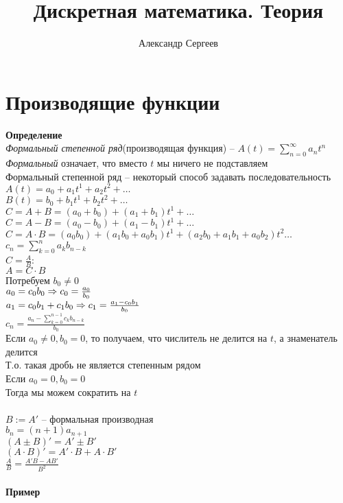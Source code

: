 \documentclass[12pt]{article}
\title{Дискретная математика. Теория}
\author{Александр Сергеев}
\date{}
\begin{document}
\maketitle
\section{Производящие функции}
\textbf{Определение}\\
\textit{Формальный степенной ряд}(производящая функция) -- $A(t) = \sum_{n=0}^\infty a_nt^n$\\
\textit{Формальный} означает, что вместо $t$ мы ничего не подставляем\\
Формальный степенной ряд -- некоторый способ задавать последовательность\\
$A(t) = a_0 + a_1t^1 + a_2t^2 + \ldots$\\
$B(t) = b_0 + b_1t^1 + b_2t^2 + \ldots$\\
$C=A + B = (a_0+b_0) + (a_1+b_1)t^1 + \ldots$\\
$C=A - B = (a_0-b_0) + (a_1-b_1)t^1 + \ldots$\\
$C=A \cdot B = (a_0b_0) + (a_1b_0 + a_0b_1)t^1 + (a_2b_0 + a_1b_1 + a_0b_2)t^2\ldots$\\
$c_n = \sum_{k=0}^na_kb_{n-k}$\\
$C=\frac{A}{B}$:\\
$A=C\cdot B$\\
Потребуем $b_0 \neq 0$\\
$a_0 = c_0b_0 \Rightarrow c_0 = \frac{a_0}{b_0}$\\
$a_1 = c_0b_1 + c_1b_0 \Rightarrow c_1 = \frac{a_1-c_0b_1}{b_0}$\\
$c_n = \frac{a_n - \sum_{k=0}^{n-1}c_kb_{n-k}}{b_0}$\\
Если $a_0 \neq 0, b_0 = 0$, то получаем, что числитель не делится на $t$, а знаменатель делится\\
Т.о. такая дробь не является степенным рядом\\
Если $a_0=0, b_0 = 0$\\
Тогда мы можем сократить на $t$\\\\
$B:=A'$ -- формальная производная\\
$b_n=(n+1)a_{n+1}$\\
$(A\pm B)' = A'\pm B'$\\
$(A\cdot B)' = A'\cdot B + A\cdot B'$\\
$\frac{A}{B} = \frac{A'B - AB'}{B^2}$\\\\
\textbf{Пример}\\
\end{document}
